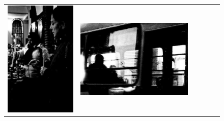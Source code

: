 \begin{figure}
\begin{tabular}{m{.01\linewidth} m{.16\linewidth} m{.16\linewidth} m{.16\linewidth} m{.16\linewidth} m{.16\linewidth}}
    \includegraphics[width=\linewidth]{../style/figures/flickr_on_flickr/pred_style_Noir/1.jpg} &
    \includegraphics[width=\linewidth]{../style/figures/flickr_on_flickr/pred_style_Noir/2.jpg} &

\end{tabular}
\end{figure}
